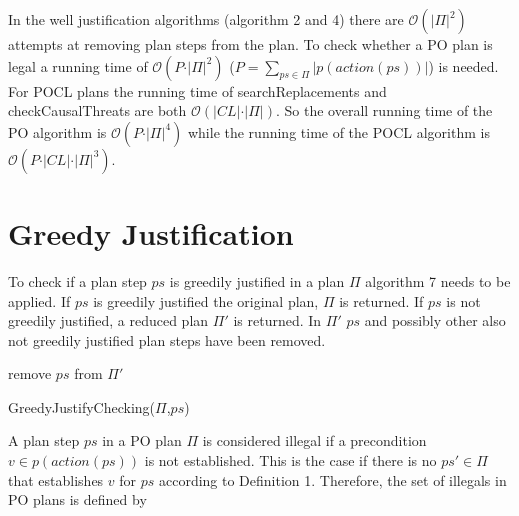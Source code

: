 In the well justification algorithms (algorithm 2 and 4) there are $\mathcal{O}(\vert \Pi \vert^{2})$
attempts at removing plan steps from the plan. To check whether a PO plan is legal a running time 
of $\mathcal{O}(P\cdot\vert\Pi\vert^{2})$ ($P=\sum_{ps \in \Pi} \vert p(action(ps))\vert$) is needed.
For POCL plans the running time of searchReplacements and checkCausalThreats are both
 $\mathcal{O}(\vert CL \vert \cdot \vert \Pi \vert)$.
So the overall running time of the PO algorithm is $\mathcal{O}(P\cdot\vert\Pi\vert^{4})$ while 
the running time of the POCL algorithm is $\mathcal{O}(P \cdot \vert CL \vert \cdot \vert \Pi \vert^3)$.
\newpage


\section{Greedy Justification}

To check if a plan step $ps$ is greedily justified in a plan $\Pi$ algorithm 7 \cite{Justification} needs to be applied. 
If $ps$ is greedily justified the original plan, $\Pi$ is returned. If $ps$ is not greedily justified, a reduced plan $\Pi'$ is returned.
In $\Pi'$ $ps$ and possibly other also not greedily justified plan steps have been removed.


\begin{algorithm}[h]
    \SetAlgoLined
    remove $ps$ from $\Pi'$ \;
        
    \caption{GreedyJustifyChecking($\Pi$,$ps$)}
\end{algorithm}


A plan step $ps$ in a PO plan $\Pi$ is considered illegal if a precondition $v \in p(action(ps))$ is not established.
This is the case if there is no $ps' \in \Pi$ that establishes $v$ for $ps$ according to Definition 1. 
Therefore, the set of illegals in PO plans is defined by


